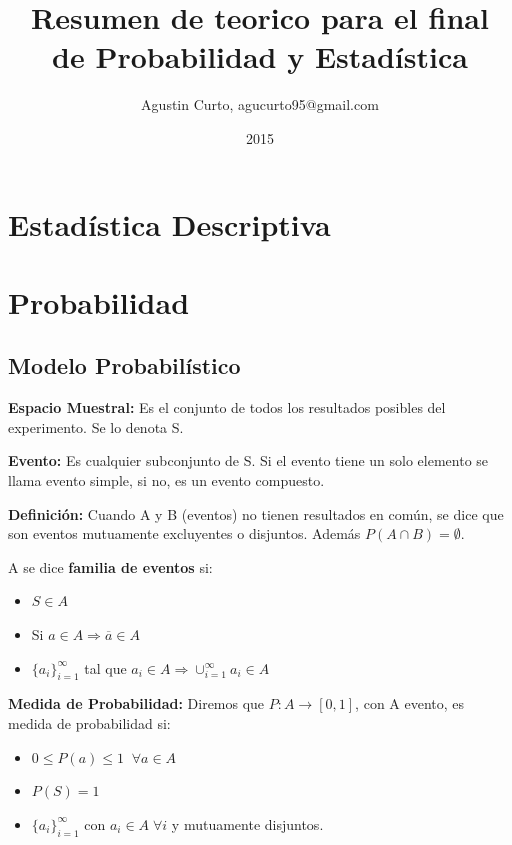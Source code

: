 \documentclass[12pt,a4paper]{report}
\author{Agustin Curto, agucurto95@gmail.com}
\title{Resumen de teorico para el final \\ de Probabilidad y Estadística}
\date{2015}
\begin{document}
\maketitle
\tableofcontents

\chapter{Estadística Descriptiva}
\chapter{Probabilidad}
	\section{Modelo Probabilístico}
		\par \textbf{Espacio Muestral:} Es el conjunto de todos los resultados posibles del experimento. Se lo denota S.
		\vspace{3mm}
		\par \textbf{Evento:} Es cualquier subconjunto de S. Si el evento tiene un solo elemento se llama evento simple, si no, es un evento compuesto.
		\vspace{3mm}
		\par \textbf{Definición:} Cuando A y B (eventos) no tienen resultados en común, se dice que son eventos mutuamente excluyentes o disjuntos. Además $P(A \cap B) = \emptyset$.
		\vspace{3mm}
		\par A se dice \textbf{familia de eventos} si:
		\begin{itemize}
			\item $S \in A$
			\item Si $a \in A \Rightarrow \overline{a} \in A$
			\item $\lbrace a_{i} \rbrace_{i=1}^{\infty}$ tal que $a_{i} \in A \Rightarrow \cup_{i=1}^{\infty} a_{i} \in A$
		\end{itemize}
		
		\vspace{3mm}
		\par \textbf{Medida de Probabilidad:} Diremos que $P: A \rightarrow \left[0, 1\right]$, con A evento, es medida de probabilidad si:
		\begin{itemize}
			\item $0 \leq P(a) \leq 1 \;\; \forall a \in A$
			\item $P(S) = 1$
			\item $\lbrace a_{i} \rbrace_{i=1}^{\infty}$ con $a_{i} \in A \; \forall i$ y mutuamente disjuntos.	
		\end{itemize}
		
\end{document}
